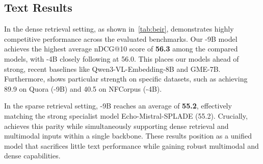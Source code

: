 
\subsection{Text Results}\label{sec:text-results}
In the dense retrieval setting, as shown in~\autoref{tab:beir}, \ours demonstrates highly competitive performance across the evaluated benchmarks. Our \ours-9B model achieves the highest average nDCG@10 score of \textbf{56.3} among the compared models, with \ours-4B closely following at 56.0. This places our models ahead of strong, recent baselines like Qwen3-VL-Embedding-8B and GME-7B. Furthermore, \ours shows particular strength on specific datasets, such as achieving 89.9 on Quora (\ours-9B) and 40.5 on NFCorpus (\ours-4B).  

In the sparse retrieval setting, \ours-9B reaches an average of \textbf{55.2}, effectively matching the strong specialist model Echo-Mistral-SPLADE (55.2). Crucially, \ours achieves this parity while simultaneously supporting dense retrieval and multimodal inputs within a single backbone. These results position \ours as a unified model that sacrifices little text performance while gaining robust multimodal and dense capabilities. 
